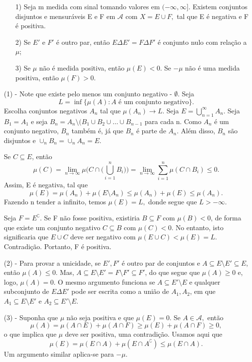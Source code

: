 \documentclass[measure_theory.tex]{subfiles}
\begin{document}
\hypertarget{hahn}{
	\begin{theorem*}
		\begin{itemize}
			\item[1)] Seja m medida com sinal tomando valores em \((-\infty, \infty]\). Existem conjuntos disjuntos e mensuráveis E e F em \(\mathcal{A}\) com \(X = E \cup F,\) tal que E é negativa e F é positiva.
			\item[2)] Se \(E'\) e \(F'\) é outro par, então \(E\Delta E' = F\Delta F'\) é conjunto nulo com relação a \(\mu \);
			\item[3)] Se \(\mu \) não é medida positiva, então \(\mu (E) < 0\). Se \(-\mu \) não é uma medida positiva, então \(\mu (F) > 0.\)
		\end{itemize}
	\end{theorem*}}
\begin{proof*}
	(1) - Note que existe pelo menos um conjunto negativo - \(\emptyset \). Seja
	\[
		L = \inf_{}\{\mu (A): A \text{ é um conjunto negativo}\}.
	\]
	Escolha conjuntos negativos \(A_{n}\) tal que \(\mu (A_{n})\to L.\)  Seja \(E = \bigcup_{n=1}^{\infty}A_{n}.\) Seja \(B_1 = A_1\) e seja \(B_{n} = A_{n}\setminus{(B_1\cup B_2\cup \dotsc \cup B_{n-1}}\) para cada n. Como \(A_{n}\) é um conjunto negativo, \(B_{n}\) também é, já que \(B_{n}\) é parte de \(A_{n}\).
	Além disso, \(B_{n}\) são disjuntos e \(\cup _n B_{n} = \cup_{n}^{}A_{n} = E.\)

	Se \(C\subseteq E\), então
	\[
		\mu (C) = \lim_{n\to \infty}\mu \biggl(C\cap \biggl(\bigcup_{i=1}^{n}B_{i}\biggr)\biggr) = \lim_{n\to \infty}\sum\limits_{i=1}^{n}\mu (C\cap B_{i}) \leq 0.
	\]
	Assim, E é negativa, tal que
	\[
		\mu (E) = \mu (A_{n}) + \mu (E\setminus{A_{n}}) \leq \mu (A_{n}) + \mu (E) \leq \mu (A_{n}).
	\]
	Fazendo n tender a infinito, temos \(\mu (E) = L,\) donde segue que \(L> -\infty.\)

	Seja \(F = E ^{\complement}.\) Se F não fosse positiva, existiria \(B\subseteq F\) com \(\mu (B) < 0\), de forma que existe um conjunto negativo \(C\subseteq B\) com \(\mu (C) < 0.\) No entanto, isto significaria que
	\(E\cup C\) deve ser negativo com \(\mu (E\cup C) < \mu (E) = L.\) Contradição. Portanto, F é positiva. \qedsymbol

	(2) - Para provar a unicidade, se \(E', F'\) é outro par de conjuntos e \(A\subseteq E\setminus{E'}\subseteq E\), então \(\mu (A) \leq 0\). Mas, \(A\subseteq E\setminus{E'} = F\setminus{F'}\subseteq F'\), do que segue que \(\mu (A)\geq 0\) e, logo,
	\(\mu (A)=0.\) O mesmo argumento funciona se \(A\subseteq E'\setminus{E}\) e qualquer subconjunto de \(E\Delta E'\) pode ser escrita como a união de \(A_1, A_2\), em que \(A_1\subseteq E\setminus{E'}\) e \(A_2\subseteq E'\setminus{E}.\)

	(3) - Suponha que \(\mu \) não seja positiva e que \(\mu (E) = 0\). Se \(A\in \mathcal{A},\) então
	\[
		\mu (A) = \mu (A\cap E) + \mu (A\cap F) \geq \mu (E) + \mu (A\cap F)\geq 0,
	\]
	o que implica que \(\mu \) deve ser positiva, uma contradição. Usamos aqui que
	\[
		\mu (E) = \mu (E\cap A) + \mu (E\cap A ^{\complement}) \leq \mu (E\cap A).
	\]
	Um argumento similar aplica-se para \(-\mu \). \qedsymbol
\end{proof*}
\end{document}
